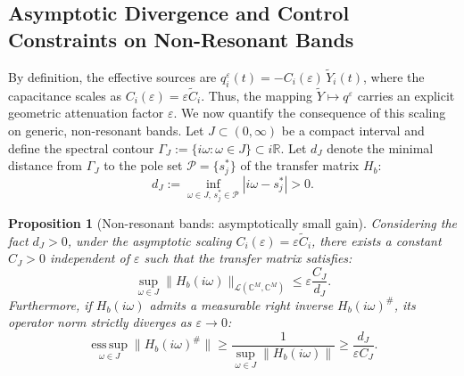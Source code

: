 \documentclass[11pt,a4paper]{article}
\numberwithin{equation}{section}
\newtheorem{proposition}[theorem]{Proposition}
\newcommand{\veps}{\varepsilon}
\begin{document}
\subsection{Asymptotic Divergence and Control Constraints on Non-Resonant Bands}
\label{subsec:gain-estimates}
\noindent
By definition, the effective sources are $q_i^\veps(t) = -C_i(\veps)\,\widetilde Y_i(t)$, where the capacitance scales as $C_i(\veps)=\veps \tilde C_i$. Thus, the mapping $\widetilde Y \mapsto q^\veps$ carries an explicit geometric attenuation factor $\veps$. We now quantify the consequence of this scaling on generic, non-resonant bands.
\newline
Let $J\subset(0,\infty)$ be a compact interval and define the spectral contour $\Gamma_J := \{i\omega : \omega \in J\} \subset i\mathbb{R}$. Let $d_J$ denote the minimal distance from $\Gamma_J$ to the pole set $\mathcal{P} = \{s_j^\ast\}$ of the transfer matrix $H_b$:
\[
 d_J := \inf_{\omega \in J, \, s_j^\ast \in \mathcal{P}} |i\omega - s_j^\ast|>0.
\]

\begin{proposition}[Non-resonant bands: asymptotically small gain]
\label{prop:nonresonant-gain}
Considering the fact $d_J>0$, under the asymptotic scaling $C_i(\varepsilon) = \varepsilon \tilde{C}_i$, there exists a constant $C_J>0$ independent of $\varepsilon$ such that the transfer matrix satisfies:
\begin{equation}
\label{eq:nonresonant-bound}
 \sup_{\omega\in J} \|H_b(i\omega)\|_{\mathcal{L}(\mathbb{C}^M,\mathbb{C}^M)} \le \varepsilon \frac{C_J}{d_J}.
\end{equation}
Furthermore, if $H_b(i\omega)$ admits a measurable right inverse $H_b(i\omega)^{\#}$, its operator norm strictly diverges as $\varepsilon \to 0$:
\[
\operatorname*{ess\,sup}_{\omega\in J}\|H_b(i\omega)^{\#}\|\ge \frac{1}{\sup_{\omega\in J}\|H_b(i\omega)\|} \ge \frac{d_J}{\varepsilon C_J}.
\]
\end{proposition}
\end{document}
